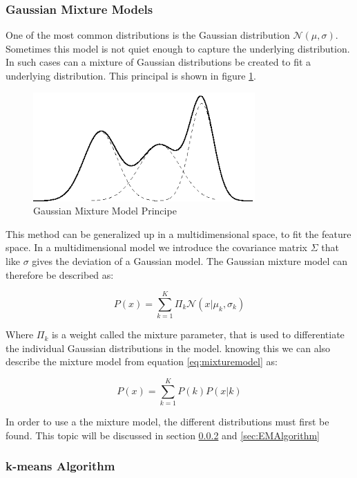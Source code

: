 \subsubsection{Gaussian Mixture Models}
\label{sec:GMM}
One of the most common distributions is the Gaussian distribution $ \mathcal{N}(\mu,\sigma)$. Sometimes this model is not quiet enough to capture the underlying distribution. In such cases can a mixture of Gaussian distributions be created to fit a underlying distribution. This principal is shown in figure \ref{fig:mixturemodel}. 

\begin{figure}[H]
\centering
\includegraphics[scale=0.5]{billeder/MixtureModel}
\caption{Gaussian Mixture Model Principe}
\label{fig:mixturemodel}
\end{figure}

This method can be generalized up in a multidimensional space, to fit the feature space. In a multidimensional model we introduce the covariance matrix $\Sigma$ that like $\sigma$ gives the deviation of a Gaussian model. The Gaussian mixture model can therefore be described as: 

\begin{equation}
 P(x) = \sum\limits_{k=1}^K{ \Pi_k \mathcal{N}(x|\mu_k,\sigma_k) }
\label{eq:mixturemodel}
\end{equation}

Where $\Pi_k$ is a weight called the mixture parameter, that is used to differentiate the individual Gaussian distributions in the model. knowing this we can also describe the mixture model from equation \ref{eq:mixturemodel} as: 

\begin{equation}
 P(x) = \sum\limits_{k=1}^K{ P(k) P(x|k) }
\label{Eq:mixturemodel}
\end{equation}

In order to use a the mixture model, the different distributions must first be found. This topic will be discussed in section \ref{sec:k-means} and \ref{sec:EMAlgorithm}

\subsubsection{k-means Algorithm}
\label{sec:k-means}

